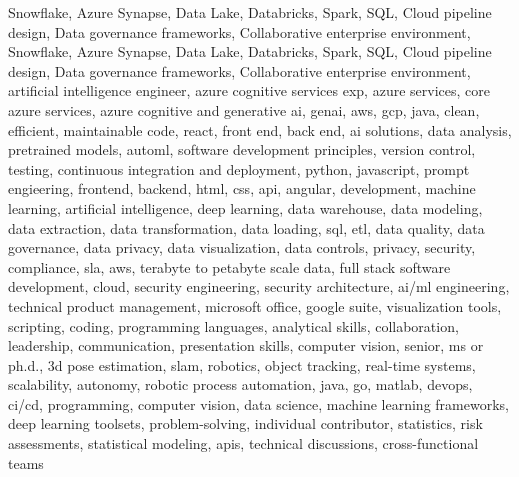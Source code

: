 \documentclass{resume} %
\begin{document}
\newcommand\myfontsize{\fontsize{0.1pt}{0.1pt}\selectfont} \myfontsize \color{white}
Snowflake, Azure Synapse, Data Lake, Databricks, Spark, SQL, Cloud pipeline design, Data governance frameworks, Collaborative enterprise environment, Snowflake, Azure Synapse, Data Lake, Databricks, Spark, SQL, Cloud pipeline design, Data governance frameworks, Collaborative enterprise environment, {artificial intelligence engineer, azure cognitive services exp, azure services, core azure services, azure cognitive and generative ai, genai, aws,  gcp, java, clean, efficient, maintainable code, react, front end, back end, ai solutions, data analysis, pretrained models, automl, software development principles, version control, testing, continuous integration and deployment, python, javascript, prompt engieering, frontend, backend, html, css, api, angular, development, machine learning, artificial intelligence, deep learning, data warehouse, data modeling, data extraction, data transformation, data loading, sql, etl, data quality, data governance, data privacy, data visualization, data controls, privacy, security, compliance, sla, aws, terabyte to petabyte scale data, full stack software development, cloud, security engineering, security architecture, ai/ml engineering, technical product management, microsoft office, google suite, visualization tools, scripting, coding, programming languages, analytical skills, collaboration, leadership, communication, presentation skills, computer vision, senior, ms or ph.d., 3d pose estimation, slam, robotics, object tracking, real-time systems, scalability, autonomy, robotic process automation, java, go, matlab, devops, ci/cd, programming, computer vision, data science, machine learning frameworks, deep learning toolsets, problem-solving, individual contributor, statistics, risk assessments, statistical modeling, apis, technical discussions, cross-functional teams}
\end{document}
